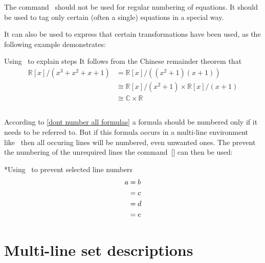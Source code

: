 The command~ should not be used for regular numbering of equations.
It should be used to tag only certain (often a single) equations in a special way.

It can also be used to express that certain transformations have been used, as the following example demonstrates:
\begin{showlatex}{Using~ to explain steps}
It follows from the Chinese remainder theorem that
\begin{align*}
  \mathbb{R}[x] / ( x^3 + x^2 + x + 1 )
  &=
  \mathbb{R}[x] / ( (x^2 + 1) (x + 1) )
  \\
  &\cong
  \mathbb{R}[x] / ( x^2 + 1 ) \times \mathbb{R}[x] / ( x + 1 )
  \tag{CRT}
  \\
  &\cong
  \mathbb{C} \times \mathbb{R}
\end{align*}
\end{showlatex}



\subsection{}

According to \cref{dont number all formulas} a formula should be numbered only if it needs to be referred to.
But if this formula occurs in a multi-line environment like~ then all occuring lines will be numbered, even unwanted ones.
The prevent the numbering of the unrequired lines the command~[\comname] can then be used:
\begin{showlatex}*{Using~ to prevent selected line numbers}
\begin{align}
  a
  &= b \notag \\
  &= c \\
  &= d \notag \\
  &= e
\end{align}
\end{showlatex}





\section{Multi-line set descriptions}

